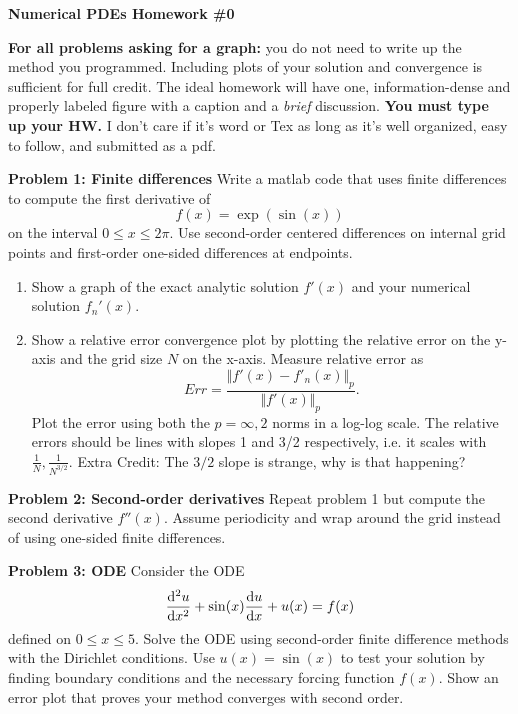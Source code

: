 \documentclass[12pt]{article}
\begin{document}
\begin{center}
\textbf{Numerical PDEs Homework \#0}\\
\end{center}

\noindent \textbf{For all problems asking for a graph:} you do not need to write up the method you programmed. Including plots of your solution and convergence is sufficient for full credit. The ideal homework will have one, information-dense and properly labeled figure with a caption and a \textit{brief} discussion. \textbf{You must type up your HW.} I don't care if it's word or Tex as long as it's well organized, easy to follow, and submitted as a pdf. 

\vspace{0.3cm}

\noindent \textbf{Problem 1: Finite differences}
Write a matlab code that uses finite differences to compute the first derivative of
$$f(x) = \exp(\sin(x))$$
on the interval $0 \leq x \leq 2\pi$. Use second-order centered differences on internal grid points and first-order one-sided differences at endpoints. 
\begin{enumerate}
    \item Show a graph of the exact analytic solution $f'(x)$ and your numerical solution $f_n'(x)$. 
    \item Show a relative error convergence plot by plotting the relative error on the y-axis and the grid size $N$ on the x-axis. Measure relative error as 
    $$Err = \frac{\Vert f'(x) - f'_n(x) \Vert_p}{\Vert f'(x) \Vert_p}.$$
    \noindent Plot the error using both the $p=\infty,2$ norms in a log-log scale. The relative errors should be lines with slopes 1 and 3/2 respectively, i.e. it scales with $\displaystyle \frac{1}{N}, \frac{1}{N^{3/2}}$. Extra Credit: The $3/2$ slope is strange, why is that happening?
\end{enumerate}

\vspace{0.5cm}

\noindent \textbf{Problem 2: Second-order derivatives}
Repeat problem 1 but compute the second derivative $f''(x)$. Assume periodicity and wrap around the grid instead of using one-sided finite differences.

\vspace{0.5cm}

\noindent \textbf{Problem 3: ODE}
Consider the ODE
$$\dv[2]{u}{x} + \sin(x) \dv{u}{x} + u(x) = f(x)$$
defined on $0 \leq x \leq 5$. Solve the ODE using second-order finite difference methods with the Dirichlet conditions. Use $u(x) = \sin(x)$ to test your solution by finding boundary conditions and the necessary forcing function $f(x)$. Show an error plot that proves your method converges with second order. 
\end{document}
